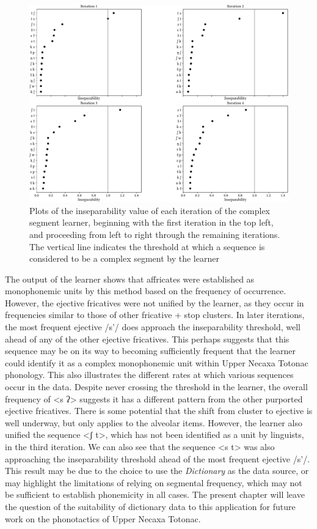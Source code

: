 \documentclass[output=paper,colorlinks,citecolor=brown]{langscibook}
\begin{document}
\begin{figure}
   \includegraphics[width=1.0\textwidth]{figures/insepPlotsFinal.pdf}
    \caption{Plots of the inseparability value of each iteration of the complex segment learner, beginning with the first iteration in the top left, and proceeding from left to right through the remaining iterations. The vertical line indicates the threshold at which a sequence is considered to be a complex segment by the learner}
    \label{fig:insepPlot2}
\end{figure}

The output of the learner shows that affricates were established as monophonemic units by this method based on the frequency of occurrence. However, the ejective fricatives were not unified by the learner, as they occur in frequencies similar to those of other fricative + stop clusters. In later iterations, the most frequent ejective {/s'/} does approach the inseparability threshold, well ahead of any of the other ejective fricatives. This perhaps suggests that this sequence may be on its way to becoming sufficiently frequent that the learner could identify it as a complex monophonemic unit within Upper Necaxa Totonac phonology. This also illustrates the different rates at which various sequences occur in the data. Despite never crossing the threshold in the learner, the overall frequency of <s ʔ> suggests it has a different pattern from the other purported ejective fricatives. There is some potential that the shift from cluster to ejective is well underway, but only applies to the alveolar items. However, the learner also unified the sequence <{ʃ} t>, which has not been identified as a unit by linguists, in the third iteration. We can also see that the sequence <s t> was also approaching the inseparability threshold ahead of the most frequent ejective {/s'/}. This result may be due to the choice to use the \textit{Dictionary} as the data source, or may highlight the limitations of relying on segmental frequency, which may not be sufficient to establish phonemicity in all cases. The present chapter will leave the question of the suitability of dictionary data to this application for future work on the phonotactics of Upper Necaxa Totonac.
\end{document}
